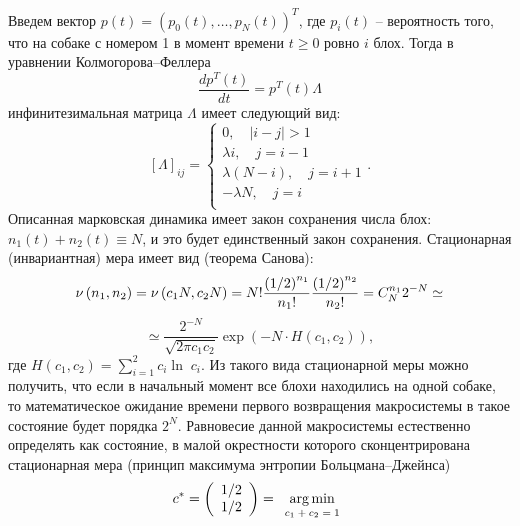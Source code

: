 \begin{ordre}
Введем вектор $p\left( t \right)=\left( {p_0 
\left( t \right),\ldots,p_N \left( t \right)} \right)^T$, где $p_i \left( t 
\right)$ -- вероятность того, что на собаке с номером 1 в 
момент времени $t\ge 0$ ровно $i$ блох. Тогда в уравнении 
Колмогорова--Феллера \cite{1}
\[
\frac{d p^T\left( t \right)}{dt}= p^T\left( t \right)\Lambda 
\]
инфинитезимальная матрица $\Lambda $ имеет следующий вид:
\[
\left[ \Lambda \right]_{ij} =\left\{ {\begin{array}{l}
 0,\quad \left| {i-j} \right|>1 \\ 
 \lambda i,\quad j=i-1 \\ 
 \lambda \left( {N-i} \right),\quad j=i+1 \\ 
 -\lambda N,\quad j=i \\ 
 \end{array}} \right..
\]
Описанная марковская динамика имеет закон сохранения числа блох: $n_1 \left( 
t \right)+n_2 \left( t \right)\equiv N$, и это будет единственный закон 
сохранения. Стационарная (инвариантная) мера имеет вид (теорема Санова):
\[
\nu \left( {n_1 ,n_2 } \right)=\nu \left( {c_1 N,c_2 N} 
\right)=N!\frac{\left( {1 \mathord{\left/ {\vphantom {1 2}} \right. 
\kern-\nulldelimiterspace} 2} \right)^{n_1 }}{n_1 !}\frac{\left( {1 
\mathord{\left/ {\vphantom {1 2}} \right. \kern-\nulldelimiterspace} 2} 
\right)^{n_2 }}{n_2 !}=C_N^{n_1 } 2^{-N}\simeq 
\]
\[\simeq\frac{2^{-N}}{\sqrt {2\pi c_1 
c_2 } }\exp \left( {-N\cdot H\left( {c_1 ,c_2 } \right)} \right),
\]
где $H\left( {c_1 ,c_2 } \right)=\sum\limits_{i=1}^2 {c_i \ln } \;c_i $. 
Из такого вида стационарной меры можно получить, что если 
в начальный момент все блохи находились на одной собаке, то математическое 
ожидание времени первого возвращения макросистемы в такое состояние будет 
порядка $2^N$. Равновесие данной макросистемы естественно определять как 
состояние, в малой окрестности которого сконцентрирована стационарная мера 
(принцип максимума энтропии Больцмана--Джейнса)
\[
c^\ast =\left( {\begin{array}{l}
 1 \mathord{\left/ {\vphantom {1 2}} \right. \kern-\nulldelimiterspace} 2 \\ 
 1 \mathord{\left/ {\vphantom {1 2}} \right. \kern-\nulldelimiterspace} 2 \\ 
 \end{array}} \right)=\mathop {\arg \min }\limits_{\begin{scriptsize}\begin{array}{c}
 c_1 +c_2 =1 \\ 

\end{array}
\end{scriptsize}}\]
\end{ordre}
